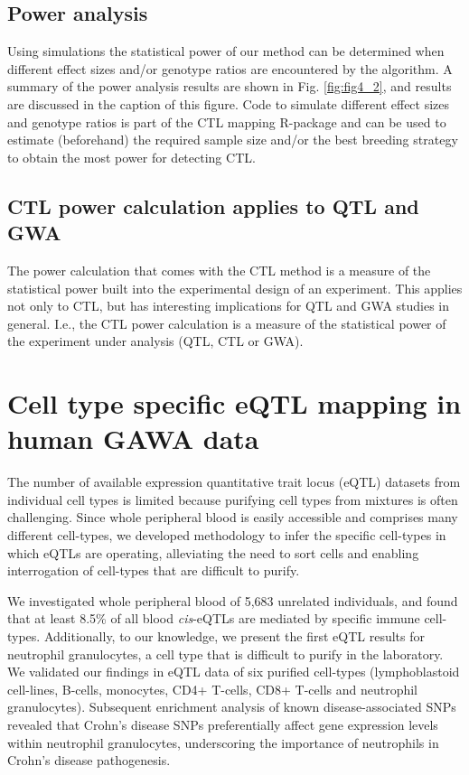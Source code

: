   \subsection{Power analysis}
  Using simulations the statistical power of our method can be determined when different effect sizes and/or genotype ratios 
  are encountered by the algorithm. A summary of the power analysis results are shown in Fig. \ref{fig:fig4_2}, and results 
  are discussed in the caption of this figure. 
  Code to simulate different effect sizes and genotype ratios is part of the CTL mapping R-package and can be used 
  to estimate (beforehand) the required sample size and/or the best breeding strategy to obtain the most power for detecting 
  CTL.

  \subsection{CTL power calculation applies to QTL and GWA}
  The power calculation that comes with the CTL method is a measure of the statistical power built into the experimental design 
  of an experiment. This applies not only to CTL, but has interesting implications for QTL and GWA studies in general. I.e., 
  the CTL power calculation is a measure of the statistical power of the experiment under analysis (QTL, CTL or GWA).

\section{Cell type specific eQTL mapping in human GAWA data}
\label{sec:cellspecificeqtl}
  The number of available expression quantitative trait locus (eQTL) datasets from individual cell 
  types is limited because purifying cell types from mixtures is often challenging.  Since whole 
  peripheral blood is easily accessible and comprises many different cell-types, we developed 
  methodology to infer the specific cell-types in which eQTLs are operating,  alleviating the need 
  to sort cells and enabling interrogation of cell-types that are difficult to purify.

  We investigated whole peripheral blood of 5,683 unrelated individuals, and found that at least 
  8.5\% of all blood \emph{cis}-eQTLs are mediated by specific immune cell-types. Additionally, to our 
  knowledge, we present the first eQTL results for neutrophil granulocytes, a cell type that is 
  difficult to purify in the laboratory. We validated our findings in eQTL data of six purified 
  cell-types (lymphoblastoid cell-lines, B-cells, monocytes, CD4+ T-cells, CD8+ T-cells and 
  neutrophil granulocytes). Subsequent enrichment analysis of known disease-associated SNPs 
  revealed that Crohn's disease SNPs preferentially affect gene expression levels within neutrophil 
  granulocytes, underscoring the importance of neutrophils in Crohn's disease pathogenesis.

